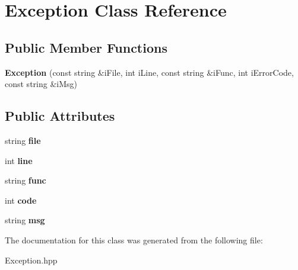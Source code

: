 \hypertarget{classException}{}\section{Exception Class Reference}
\label{classException}
\subsection*{Public Member Functions}
\begin{DoxyCompactItemize}
\item 
\mbox{\label{classException_af2c987e414daf2aa533f332fa64d3b16}} 
{\bfseries Exception} (const string \&i\+File, int i\+Line, const string \&i\+Func, int i\+Error\+Code, const string \&i\+Msg)
\end{DoxyCompactItemize}
\subsection*{Public Attributes}
\begin{DoxyCompactItemize}
\item 
\mbox{\label{classException_abd8d8a4c6aaf9e4c964bb6b7363aef8d}} 
string {\bfseries file}
\item 
\mbox{\label{classException_adee367a152767bb4fed267b5f2d337f0}} 
int {\bfseries line}
\item 
\mbox{\label{classException_a4f55da875481f85c4ad1da7eaa7e3279}} 
string {\bfseries func}
\item 
\mbox{\label{classException_a9a71c9fe2c765fc8dd0f7e97a20b636b}} 
int {\bfseries code}
\item 
\mbox{\label{classException_a7e23ca295a3accfb0024a28a3ef4e974}} 
string {\bfseries msg}
\end{DoxyCompactItemize}


The documentation for this class was generated from the following file\+:\begin{DoxyCompactItemize}
\item 
Exception.\+hpp\end{DoxyCompactItemize}
